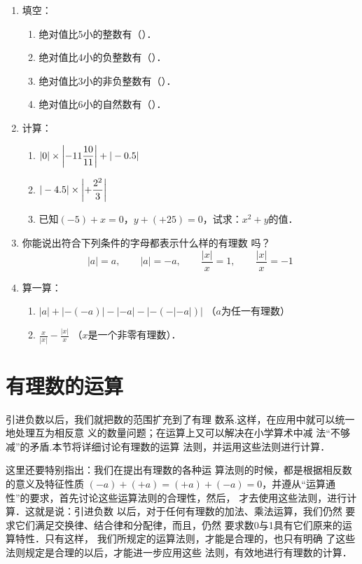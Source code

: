 \begin{enumerate}
	\item 填空：
	\begin{enumerate}
		\item 绝对值比5小的整数有（\qquad \qquad ）．
		\item 绝对值比4小的负整数有（\qquad \qquad ）．
		\item 绝对值比3小的非负整数有（\qquad \qquad ）．
		\item 绝对值比6小的自然数有（\qquad \qquad ）．
	\end{enumerate}
	
	
	\item 计算：
	\begin{enumerate}
		\item $|0|\times \left|-11\dfrac{10}{11}\right|+|-0.5|$
		\item $|-4.5|\times\left|+\dfrac{2^2}{3}\right|$
		\item 已知$(-5)+x=0$，$y+(+25)=0$，试求：$x^2+y$的值．
	\end{enumerate}
	
	\item 你能说出符合下列条件的字母都表示什么样的有理数
	吗？
	\[|a|=a,\qquad |a|=-a,\qquad \frac{|x|}{x}=1,\qquad \frac{|x|}{x}=-1  \]
	
	\item 算一算：
	\begin{enumerate}
		\item $|a|+|-(-a)|-|-a|-|-(-|-a|)|$ （$a$为任一有理数）
		\item $\frac{x}{|x|}-\frac{|x|}{x}$ （$x$是一个非零有理数）．
	\end{enumerate}
	
\end{enumerate}

\section{有理数的运算}
引进负数以后，我们就把数的范围扩充到了有理
数系.这样，在应用中就可以统一地处理互为相反意
义的数量问题；在运算上又可以解决在小学算术中减
法“不够减”的矛盾.本节将详细讨论有理数的运算
法则，并运用这些法则进行计算．

这里还要特别指出：我们在提出有理数的各种运
算法则的时候，都是根据相反数的意义及特征性质
$ (-a) + ( + a)=(+a)+(-a) = 0$，并遵从“运算通
性”的要求，首先讨论这些运算法则的合理性，然后，
才去使用这些法则，进行计算．这就是说：引进负数
以后，对于任何有理数的加法、乘法运算，我们仍然
要求它们满足交换律、结合律和分配律，而且，仍然
要求数0与1具有它们原来的运算特性．只有这样，
我们所规定的运算法则，才能是合理的，也只有明确
了这些法则规定是合理的以后，才能进一步应用这些
法则，有效地进行有理数的计算．

